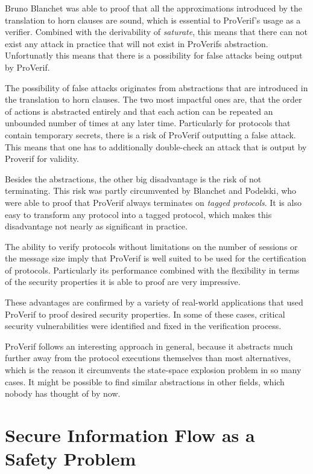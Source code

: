 \documentclass[a4paper,UKenglish]{lipics-v2018}
\begin{document}
Bruno Blanchet was able to proof that all the approximations introduced by the translation to horn clauses are sound, which is essential to ProVerif's usage as a verifier. Combined with the derivability of \textit{saturate}, this means that there can not exist any attack in practice that will not exist in ProVerifs abstraction. Unfortunatly this means that there is a possibility for false attacks being output by ProVerif.\cite{ProVerif}

The possibility of false attacks originates from abstractions that are introduced in the translation to horn clauses. The two most impactful ones are, that the order of actions is abstracted entirely and that each action can be repeated an unbounded number of times at any later time. Particularly for protocols that contain temporary secrets, there is a risk of ProVerif outputting a false attack.
This means that one has to additionally double-check an attack that is output by Proverif for validity. \cite{ProVerif}

Besides the abstractions, the other big disadvantage is the risk of not terminating. This risk was partly circumvented by Blanchet and Podelski, who were able to proof that ProVerif always terminates on \textit{tagged protocols}.\cite{tagging} It is also easy to transform any protocol into a tagged protocol, which makes this disadvantage not nearly as significant in practice.\cite{ProVerif}

The ability to verify protocols without limitations on the number of sessions or the message size imply that ProVerif is well suited to be used for the certification of protocols. Particularly its performance combined with the flexibility in terms of the security properties it is able to proof are very impressive.\cite{ProVerif}

These advantages are confirmed by a variety of real-world applications that used ProVerif to proof desired security properties. In some of  these cases, critical security vulnerabilities were identified and fixed in the verification process.

ProVerif follows an interesting approach in general, because it abstracts much further away from the protocol executions themselves than most alternatives, which is the reason it circumvents the state-space explosion problem in so many cases. It might be possible to find similar abstractions in other fields, which nobody has thought of by now.




\section{Secure Information Flow as a Safety Problem}
\end{document}
